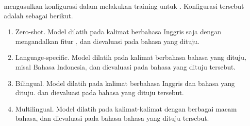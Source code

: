 \textcite{blloshmi2020} mengusulkan konfigurasi dalam melakukan training untuk \amrparsing{} \crosslingual{}.
Konfigurasi tersebut adalah sebagai berikut.
\begin{enumerate}
  \item Zero-shot.
  Model dilatih pada kalimat berbahasa Inggris saja dengan mengandalkan fitur , dan dievaluasi pada bahasa yang dituju.

  \item Language-specific.
  Model dilatih pada kalimat berbahasa bahasa yang dituju, misal Bahasa Indonesia, dan dievaluasi pada bahasa yang dituju tersebut.

  \item Bilingual.
  Model dilatih pada kalimat berbahasa Inggris dan bahasa yang dituju. dan dievaluasi pada bahasa yang dituju tersebut.

  \item Multilingual.
  Model dilatih pada kalimat-kalimat dengan berbagai macam bahasa, dan dievaluasi pada bahasa-bahasa yang dituju tersebut.
\end{enumerate}
